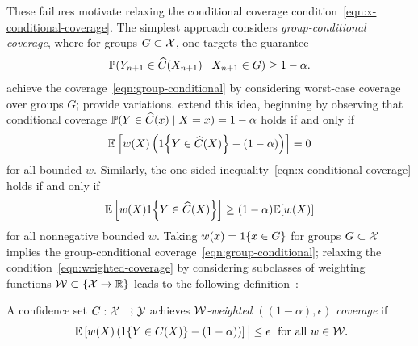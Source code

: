 \documentclass{article}
\begin{document}
These failures motivate relaxing the conditional coverage
condition~\eqref{eqn:x-conditional-coverage}.
%
The simplest approach considers
\emph{group-conditional coverage}, where for groups
$G \subset \mathcal{X}$, one targets the guarantee
\begin{align}
  \label{eqn:group-conditional}
  \mathbb{P}(Y_{n + 1} \in \widehat{C}(X_{n + 1}) \mid X_{n + 1} \in G) \ge 1 - \alpha.
\end{align}
\citet[Sec.~4]{BarberCaRaTi21a} achieve the
coverage~\eqref{eqn:group-conditional} by considering worst-case coverage
over groups $G$; \citet{JungNoRaRo23} provide
variations. %
%
\citet*{GibbsChCa25} extend this idea, beginning by observing that
conditional coverage $\mathbb{P}(Y \in \widehat{C}(x) \mid X = x) = 1 - \alpha$
holds if and only if
\begin{equation}
  \label{eqn:weighted-coverage}
  \mathbb{E}\left[w(X) \left(1\!\left\{Y \in \widehat{C}(X)\right\} - (1 - \alpha)\right)\right]
  = 0
\end{equation}
for all bounded $w$.
%
Similarly, the one-sided
inequality~\eqref{eqn:x-conditional-coverage} holds if and only if
\begin{equation*}
  \mathbb{E}\left[w(X) 1\!\left\{Y \in \widehat{C}(X)\right\}\right] \ge (1 - \alpha)
  \mathbb{E}[w(X)]
\end{equation*}
for all nonnegative bounded $w$.
%
Taking $w(x) = 1\!\left\{x \in G\right\}$ for groups $G \subset \mathcal{X}$ implies the
group-conditional coverage~\eqref{eqn:group-conditional}; relaxing the
condition~\eqref{eqn:weighted-coverage} by considering subclasses of
weighting functions $\mathcal{W} \subset \{\mathcal{X} \to \mathbb{R}\}$ leads to the
following definition~\cite{GibbsChCa25}:
\begin{definition}
  \label{definition:weighted-coverage}
  A confidence set $C : \mathcal{X} \rightrightarrows \mathcal{Y}$ achieves
  \emph{$\mathcal{W}$-weighted $((1 - \alpha), \epsilon)$ coverage} if
  \begin{equation*}
    \big|
    \mathbb{E}\left[w(X) \left(1\!\left\{Y \in C(X)\right\} - (1 - \alpha)\right)\right]
    \big| \le \epsilon
    ~~ \mbox{for all}~ w \in \mathcal{W}.
  \end{equation*}
\end{definition}
\end{document}
